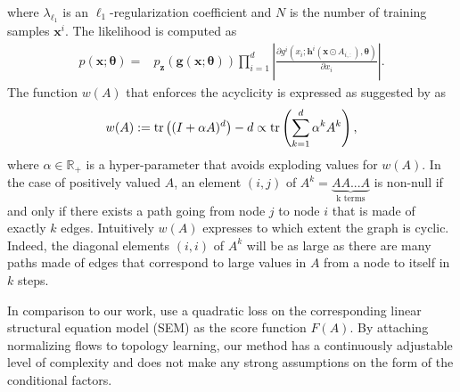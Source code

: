 where $\lambda_{\ell_1}$ is an $\ell_1$-regularization coefficient and $N$ is the number of training samples $\mathbf{x}^i$. The likelihood is computed as
\begin{align}
    p(\mathbf{x}; \mathbf{\theta})=& p_{\mathbf{z}}(\mathbf{g}(\mathbf{x}; \mathbf{\theta})) \prod_{i=1}^{d} \left| \frac{\partial g^i(x_i;\mathbf{h}^i(\mathbf{x} \odot A_{i,:}), \mathbf{\theta})}{\partial x_i} \right|. \nonumber
\end{align}
The function $w(A)$ that enforces the acyclicity is expressed as suggested by \citet{DAG-2} as
$$w(A) := \operatorname*{tr}\left((I + \alpha A)^d\right) - d \propto	\operatorname*{tr}\left(\sum^d_{k=1} \alpha^k A^k\right),$$
where $\alpha \in \mathbb{R}_+$ is a hyper-parameter that avoids exploding values for $w(A)$.
In the case of positively valued $A$, an element $(i, j)$ of $A^k = \underbrace{A A...A}_{\text{k terms}}$ is non-null if and only if there exists a path going from node $j$ to node $i$ that is made of exactly $k$ edges. Intuitively $w(A)$ expresses to which extent the graph is cyclic. Indeed, the diagonal elements $(i, i)$ of $A^k$ will be as large as there are many paths made of edges that correspond to large values in $A$ from a node to itself in $k$ steps.

In comparison to our work, \citet{DAG-1} use a quadratic loss on the corresponding linear structural equation model (SEM) as the score function $F(A)$. By attaching normalizing flows to topology learning, our method has a continuously adjustable level of complexity and does not make any strong assumptions on the form of the conditional factors. %

